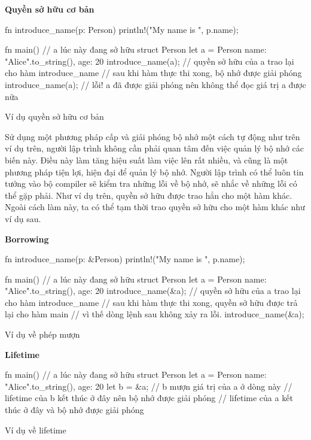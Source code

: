 \textbf{Quyền sở hữu cơ bản}
\begin{listing}[H]
\begin{rustcode}
fn introduce_name(p: Person) {
  println!("My name is {}", p.name);
}

fn main() {
  // a lúc này đang sở hữu struct Person
  let a = Person{ name: "Alice".to_string(), age: 20 }
  introduce_name(a); // quyền sở hữu của a trao lại cho hàm introduce_name
  // sau khi hàm thực thi xong, bộ nhớ được giải phóng
  introduce_name(a); // lỗi! a đã được giải phóng nên không thể đọc giá trị a được nữa
}
\end{rustcode}
\caption{Ví dụ quyền sở hữu cơ bản}
\label{code:rust_ownership_example}
\end{listing}

Sử dụng một phương pháp cấp và giải phóng bộ nhớ một cách tự động như trên ví dụ trên, người lập trình không cần phải quan tâm đến việc quản lý bộ nhớ các biến này.
Điều này làm tăng hiệu suất làm việc lên rất nhiều, và cũng là một phương pháp tiện lợi, hiện đại để quản lý bộ nhớ.
Người lập trình có thể luôn tin tưởng vào bộ compiler sẽ kiểm tra những lỗi về bộ nhớ, sẽ nhắc về những lỗi có thể gặp phải.
Như ví dụ trên, quyền sở hữu được trao hẳn cho một hàm khác.
Ngoài cách làm này, ta có thể tạm thời trao quyền sở hữu cho một hàm khác như ví dụ sau.

\textbf{Borrowing}
\begin{listing}[H]
\begin{rustcode}
fn introduce_name(p: &Person) {
  println!("My name is {}", p.name);
}

fn main() {
  // a lúc này đang sở hữu struct Person
  let a = Person{ name: "Alice".to_string(), age: 20 }
  introduce_name(&a); // quyền sở hữu của a trao lại cho hàm introduce_name
  // sau khi hàm thực thi xong, quyền sở hữu được trả lại cho hàm main
  // vì thế dòng lệnh sau không xảy ra lỗi.
  introduce_name(&a);
}
\end{rustcode}
\caption{Ví dụ về phép mượn}
\label{code:rust_borrowing_example}
\end{listing}

\pagebreak
\textbf{Lifetime}
\begin{listing}[H]
\begin{rustcode}
fn main() {
  // a lúc này đang sở hữu struct Person
  let a = Person{ name: "Alice".to_string(), age: 20 }
  {
    let b = &a; // b mượn giá trị của a ở dòng này
  } // lifetime của b kết thúc ở đây nên bộ nhớ được giải phóng
} // lifetime của a kết thúc ở đây và bộ nhớ được giải phóng
\end{rustcode}
\caption{Ví dụ về lifetime}
\label{code:rust_lifetime_example}
\end{listing}

